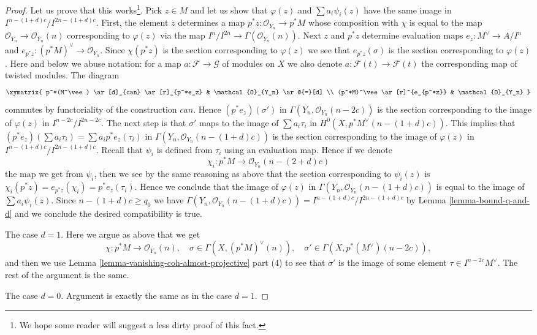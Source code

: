 \begin{proof}
\medskip\noindent
Let us prove that this works\footnote{We hope some reader will suggest
a less dirty proof of this fact.}. Pick $z \in M$ and let us show that
$\varphi(z)$ and $\sum a_i \psi_i(z)$ have the same image in
$I^{n - (1 + d)c}/I^{2n - (1 + d)c}$.
First, the element $z$ determines a map
$p^*z : \mathcal{O}_{Y_n} \to p^*M$ whose composition with
$\chi$ is equal to the map $\mathcal{O}_{Y_n} \to \mathcal{O}_{Y_n}(n)$
corresponding to $\varphi(z)$ via the map
$I^n/I^{2n} \to \Gamma(\mathcal{O}_{Y_n}(n))$.
Next $z$ and $p^*z$ determine evaluation maps
$e_z : M^\vee \to A/I^n$ and $e_{p^*z} : (p^*M)^\vee \to \mathcal{O}_{Y_n}$.
Since $\chi(p^*z)$ is the section corresponding to $\varphi(z)$
we see that $e_{p^*z}(\sigma)$ is the section corresponding to $\varphi(z)$.
Here and below we abuse notation: for a map
$a : \mathcal{F} \to \mathcal{G}$ of modules on $X$
we also denote $a : \mathcal{F}(t) \to \mathcal{F}(t)$ the corresponding
map of twisted modules. The diagram
$$
\xymatrix{
p^*(M^\vee) \ar[d]_{can} \ar[r]_{p^*e_z} & \mathcal{O}_{Y_n} \ar@{=}[d] \\
(p^*M)^\vee \ar[r]^{e_{p^*z}} & \mathcal{O}_{Y_n}
}
$$
commutes by functoriality of the construction $can$. Hence
$(p^*e_z)(\sigma')$ in $\Gamma(Y_n, \mathcal{O}_{Y_n}(n - 2c))$
is the section corresponding to the image of $\varphi(z)$
in $I^{n - 2c}/I^{2n - 2c}$.
The next step is that $\sigma'$ maps to the image
of $\sum a_i \tau_i$ in $H^0(X, p^*M^\vee(n - (1 + d)c))$.
This implies that $(p^*e_z)(\sum a_i \tau_i) = \sum a_i p^*e_z(\tau_i)$
in $\Gamma(Y_n, \mathcal{O}_{Y_n}(n - (1 + d)c))$ is the section corresponding
to the image of $\varphi(z)$ in $I^{n - (1 + d)c}/I^{2n - (1 + d)c}$.
Recall that $\psi_i$ is defined from $\tau_i$ using an evaluation
map. Hence if we denote
$$
\chi_i : p^*M \longrightarrow \mathcal{O}_{Y_n}(n - (2 + d)c)
$$
the map we get from $\psi_i$, then we see by the same reasoning
as above that the section corresponding to $\psi_i(z)$ is
$\chi_i(p^*z) = e_{p^*z}(\chi_i) = p^*e_z(\tau_i)$. Hence we conclude that
the image of $\varphi(z)$ in $\Gamma(Y_n, \mathcal{O}_{Y_n}(n - (1 + d)c))$
is equal to the image of $\sum a_i\psi_i(z)$.
Since $n - (1 + d)c \geq q_0$ we have
$\Gamma(Y_n, \mathcal{O}_{Y_n}(n - (1 + d)c)) =
I^{n - (1 + d)c}/I^{2n - (1 + d)c}$ by Lemma \ref{lemma-bound-q-and-d} and
we conclude the desired compatibility is true.

\medskip\noindent
The case $d = 1$. Here we argue as above that we get
$$
\chi : p^*M \longrightarrow \mathcal{O}_{Y_n}(n),\quad
\sigma \in \Gamma(X, (p^*M)^\vee(n)),\quad
\sigma' \in \Gamma(X, p^*(M^\vee)(n - 2c)),
$$
and then we use
Lemma \ref{lemma-vanishing-coh-almost-projective} part (4)
to see that $\sigma'$ is the image of some element
$\tau \in I^{n - 2c}M^\vee$. The rest of the argument is the same.

\medskip\noindent
The case $d = 0$. Argument is exactly the same as in the
case $d = 1$.
\end{proof}

